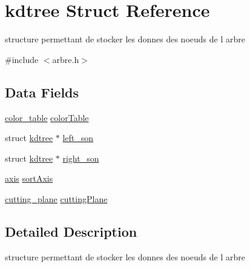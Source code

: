 \hypertarget{structkdtree}{\section{kdtree Struct Reference}
\label{structkdtree}
}


structure permettant de stocker les donnes des noeuds de l arbre  




{\ttfamily \#include $<$arbre.\-h$>$}

\subsection*{Data Fields}
\begin{DoxyCompactItemize}
\item 
\hyperlink{structcolor__table}{color\-\_\-table} \hyperlink{structkdtree_a01650587a3ddd4599ba2bd7d73799b01}{color\-Table}
\item 
struct \hyperlink{structkdtree}{kdtree} $\ast$ \hyperlink{structkdtree_aec9ab34520ea500f9e60f7a58df1d17e}{left\-\_\-son}
\item 
struct \hyperlink{structkdtree}{kdtree} $\ast$ \hyperlink{structkdtree_a192aa2e296f2f20a0709e98761dc61a7}{right\-\_\-son}
\item 
\hyperlink{table_8h_accc088009d44c521706aa98d6387ee21}{axis} \hyperlink{structkdtree_a3d58acfe3498b2606c9cd620ce3f8e11}{sort\-Axis}
\item 
\hyperlink{structcutting__plane}{cutting\-\_\-plane} \hyperlink{structkdtree_a8a891124909350e0112460ed18da147b}{cutting\-Plane}
\end{DoxyCompactItemize}


\subsection{Detailed Description}
structure permettant de stocker les donnes des noeuds de l arbre 

